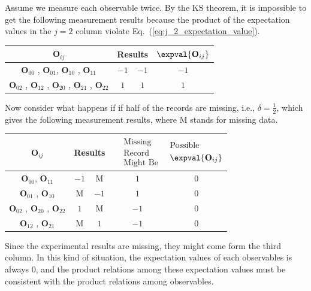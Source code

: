 \documentclass[english,reprint, aps, prl,superscriptaddress, showpacs,
showkeys, longbibliography, amsmath, amssymb, floatfix]{revtex4-1}
\theoremstyle{plain}
\theoremstyle{definition}
\newcommand{\missing}{\text{M}}
\begin{document}
Assume we measure each observable twice. By the KS theorem, it is
impossible to get the following measurement results because the product
of the expectation values in the $j=2$ column violate Eq.~(\ref{eq:j_2_expectation_value}).
\begin{center}
\begin{tabular}{cccc}
\toprule 
\addlinespace
$\mathbf{O}_{ij}$  & \multicolumn{2}{c}{Results} & $\expval{\mathbf{O}_{ij}}$\tabularnewline
\midrule
\midrule 
\addlinespace
$\mathbf{O}_{00}$ , $\mathbf{O}_{01}$, $\mathbf{O}_{10}$ , $\mathbf{O}_{11}$  & $-1$ & $-1$ & $-1$\tabularnewline
\midrule 
\addlinespace
$\mathbf{O}_{02}$ , $\mathbf{O}_{12}$ , $\mathbf{O}_{20}$ , $\mathbf{O}_{21}$
, $\mathbf{O}_{22}$  & $1$ & $1$ & $1$\tabularnewline
\bottomrule
\end{tabular}
\par\end{center}

Now consider what happens if if half of the records are missing, i.e.,
$\delta=\frac{1}{2}$, which gives the following measurement results,
where $\missing$ stands for missing data.
\begin{center}
\begin{tabular}{ccccc}
\toprule 
\addlinespace
$\mathbf{O}_{ij}$  & \multicolumn{2}{c}{Results} & $\begin{aligned} & \textrm{Missing}\\
 & \textrm{Record}\\
 & \textrm{Might Be}
\end{aligned}
$ & $\begin{aligned} & \textrm{Possible}\\
 & \expval{\mathbf{O}_{ij}}
\end{aligned}
$\tabularnewline
\midrule
\midrule 
\addlinespace
$\mathbf{O}_{00}$, $\mathbf{O}_{11}$ & $-1$ & $\missing$ & $1$ & $0$\tabularnewline
\midrule 
\addlinespace
$\mathbf{O}_{01}$ , $\mathbf{O}_{10}$  & $\missing$ & $-1$ & $1$ & $0$\tabularnewline
\midrule 
\addlinespace
$\mathbf{O}_{02}$ , $\mathbf{O}_{20}$ , $\mathbf{O}_{22}$  & $1$ & $\missing$ & $-1$ & $0$\tabularnewline
\midrule 
\addlinespace
$\mathbf{O}_{12}$ , $\mathbf{O}_{21}$  & $\missing$ & $1$ & $-1$ & $0$\tabularnewline
\bottomrule
\end{tabular}
\par\end{center}

\noindent Since the experimental results are missing, they might come
form the third column. In this kind of situation, the expectation
values of each observables is always $0$, and the product relations
among these expectation values must be consistent with the product
relations among observables.
\end{document}
